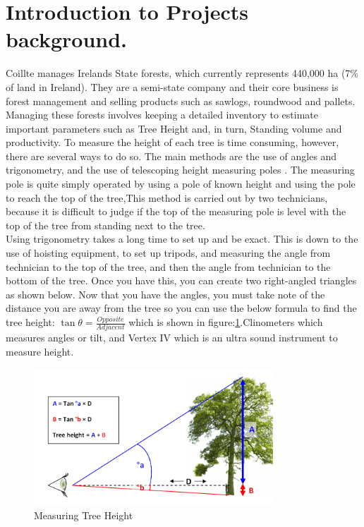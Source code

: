 \documentclass[a4paper,11pt,twoside]{report}
\begin{document}
\section{Introduction to Projects background.}
\label{sec:Welcome}
Coillte manages Irelands State forests, which currently represents 440,000 ha
(7\% of land in Ireland). They are a semi-state company and their core business is forest management and selling products such as sawlogs, roundwood and pallets. Managing these forests involves keeping a detailed inventory to estimate important parameters such as Tree Height and, in turn, Standing volume and productivity. To measure the height of each tree is time consuming, however, there are several ways to do so. The main methods are the use of angles and trigonometry, and the use of telescoping height measuring poles \cite{doi:10.1111/2041-210X.12071}. The measuring pole is quite simply operated by using a pole of known height and using the pole to reach the top of the tree,This method is carried out by two technicians, because it is difficult to judge if the top of the measuring pole is level with the top of the tree from standing next to the tree.\\
Using trigonometry takes a long time to set up and be exact. This is down to the use of hoisting equipment, to set up tripods, and measuring the angle from technician to the top of the tree, and then the angle from technician to the bottom of the tree. Once you have this, you can create two right-angled triangles as shown below. Now that you have the angles, you must take note of the distance you are away from the tree so you can use the below formula  to find the tree height: $\tan\theta = \frac{Opposite}{Adjacent}$ which is shown in figure:\ref{fig:Height}.Clinometers which measures angles or tilt, and Vertex IV which is an ultra sound instrument to measure height. \\
\begin{figure}[!hbt]
	\centering
	\includegraphics[width=0.8\textwidth]{Images/TreeHeight.png}
	\caption[Measuring Tree Height]{Measuring Tree Height}
	\label{fig:Height}
\end{figure} 
\end{document}
